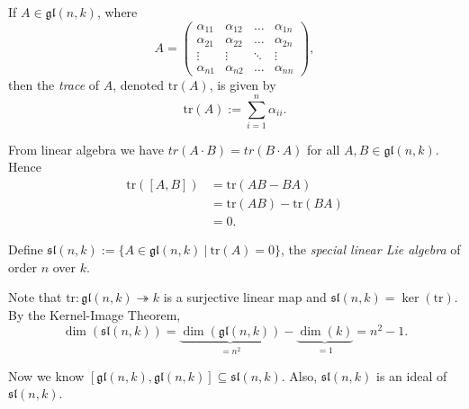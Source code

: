 \begin{definition}
	If $A \in \mathfrak{gl}(n, k)$, where
	\[
		A =
		\begin{pmatrix}
			\alpha_{11} & \alpha_{12} & \ldots & \alpha_{1n} \\
			\alpha_{21} & \alpha_{22} & \ldots & \alpha_{2n} \\
			\vdots		& \vdots	  & \ddots & \vdots \\
			\alpha_{n1} & \alpha_{n2} & \ldots & \alpha_{nn}
		\end{pmatrix},
	\]
	then the \emph{trace} of $A$, denoted $\text{tr}(A)$, is given by
	\[
		\text{tr}(A) := \sum_{i = 1}^n{\alpha_{ii}}.
	\]
	
	From linear algebra we have $tr(A \cdot B) = tr(B \cdot A)$ for all $A, B \in \mathfrak{gl}(n, k)$. Hence
	\begin{align*}
		\text{tr}([A, B]) &= \text{tr}(AB - BA) \\
				   &= \text{tr}(AB) - \text{tr}(BA) \\
				   &= 0.
	\end{align*}
\end{definition}

\begin{definition}
	Define $\mathfrak{sl}(n, k) := \{A \in \mathfrak{gl}(n, k)\ |\ \text{tr}(A) = 0\}$, the \emph{special linear Lie algebra} of order $n$ over $k$.
\end{definition}

Note that $\text{tr} : \mathfrak{gl}(n, k) \twoheadrightarrow k$ is a surjective linear map and $\mathfrak{sl}(n, k) = \ker(\text{tr})$. By the Kernel-Image Theorem,
\[
	\dim(\mathfrak{sl}(n, k)) = \underbrace{\dim(\mathfrak{gl}(n, k))}_{= n^2} - \underbrace{\dim(k)}_{= 1} = n^2 - 1.
\]

Now we know $[\mathfrak{gl}(n, k), \mathfrak{gl}(n, k)] \subseteq \mathfrak{sl}(n, k)$. Also, $\mathfrak{sl}(n, k)$ is an ideal of $\mathfrak{sl}(n, k)$.

